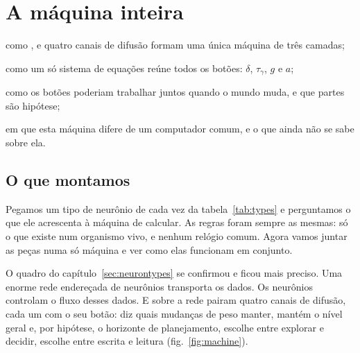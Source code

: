 \chapter{A máquina inteira}
\label{sec:synthesis}
\begin{chaptergoals}
\item como ,  e quatro canais de difusão formam uma única máquina de três camadas;
\item como um só sistema de equações reúne todos os botões: $\delta$, $\tau_\gamma$, $g$ e $a$;
\item como os botões poderiam trabalhar juntos quando o mundo muda, e que partes são hipótese;
\item em que esta máquina difere de um computador comum, e o que ainda não se sabe sobre ela.
\end{chaptergoals}

\section{O que montamos}

Pegamos um tipo de neurônio de cada vez da tabela~\ref{tab:types} e perguntamos o que ele acrescenta à máquina de calcular. As regras foram sempre as mesmas: só o que existe num organismo vivo, e nenhum relógio comum. Agora vamos juntar as peças numa só máquina e ver como elas funcionam em conjunto.

O quadro do capítulo~\ref{sec:neurontypes} se confirmou e ficou mais preciso. Uma enorme rede endereçada de neurônios  transporta os dados. Os neurônios  controlam o fluxo desses dados. E sobre a rede pairam quatro canais de difusão, cada um com o seu botão:  diz quais mudanças de peso manter,  mantém o nível geral e, por hipótese, o horizonte de planejamento,  escolhe entre explorar e decidir,  escolhe entre escrita e leitura (fig.~\ref{fig:machine}).

